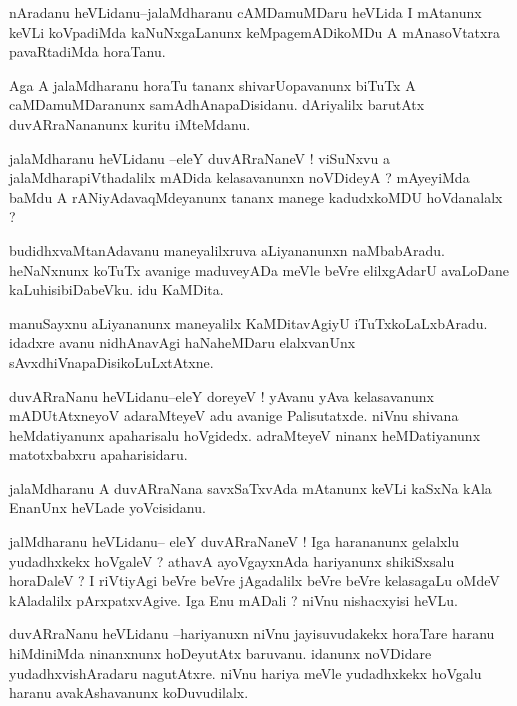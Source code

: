 \documentclass{article}
\begin{document}
\begin{mn}%
nAradanu heVLidanu--jalaMdharanu cAMDamuMDaru heVLida I mAtanunx keVLi koVpadiMda 
kaNuNxgaLanunx keMpagemADikoMDu A mAnasoVtatxra pavaRtadiMda horaTanu.
\end{mn}

\begin{mn}%
Aga A jalaMdharanu horaTu tananx shivarUopavanunx biTuTx A caMDamuMDaranunx 
samAdhAnapaDisidanu. dAriyalilx barutAtx duvARraNananunx kuritu iMteMdanu.
\end{mn}

\begin{mn}%
jalaMdharanu heVLidanu --eleY duvARraNaneV ! viSuNxvu a jalaMdharapiVthadalilx mADida 
kelasavanunxn noVDideyA ? mAyeyiMda baMdu A rANiyAdavaqMdeyanunx tananx manege kadudxkoMDU 
hoVdanalalx ? 
\end{mn}

\begin{mn}%
budidhxvaMtanAdavanu maneyalilxruva aLiyananunxn naMbabAradu. heNaNxnunx koTuTx avanige 
maduveyADa meVle beVre elilxgAdarU avaLoDane kaLuhisibiDabeVku. idu KaMDita.
\end{mn}

\begin{mn}%
manuSayxnu aLiyananunx maneyalilx KaMDitavAgiyU iTuTxkoLaLxbAradu. idadxre avanu nidhAnavAgi 
haNaheMDaru elalxvanUnx sAvxdhiVnapaDisikoLuLxtAtxne.
\end{mn}

\begin{mn}%
duvARraNanu heVLidanu--eleY doreyeV ! yAvanu yAva kelasavanunx mADUtAtxneyoV adaraMteyeV adu 
avanige Palisutatxde. niVnu shivana heMdatiyanunx apaharisalu hoVgidedx. adraMteyeV ninanx 
heMDatiyanunx matotxbabxru apaharisidaru.
\end{mn}

\begin{mn}%
jalaMdharanu A duvARraNana savxSaTxvAda mAtanunx keVLi kaSxNa kAla EnanUnx heVLade yoVcisidanu.
\end{mn}

\begin{mn}%
jalMdharanu heVLidanu-- eleY duvARraNaneV ! Iga harananunx gelalxlu yudadhxkekx hoVgaleV ? 
athavA ayoVgayxnAda hariyanunx shikiSxsalu horaDaleV ? I riVtiyAgi beVre beVre jAgadalilx 
beVre beVre kelasagaLu oMdeV kAladalilx pArxpatxvAgive. Iga Enu mADali ? niVnu nishacxyisi 
heVLu.
\end{mn}

\begin{mn}%
duvARraNanu heVLidanu --hariyanuxn niVnu jayisuvudakekx horaTare haranu hiMdiniMda 
ninanxnunx hoDeyutAtx baruvanu. idanunx noVDidare yudadhxvishAradaru nagutAtxre. niVnu 
hariya meVle yudadhxkekx hoVgalu haranu avakAshavanunx koDuvudilalx.
\end{mn}
\end{document}
